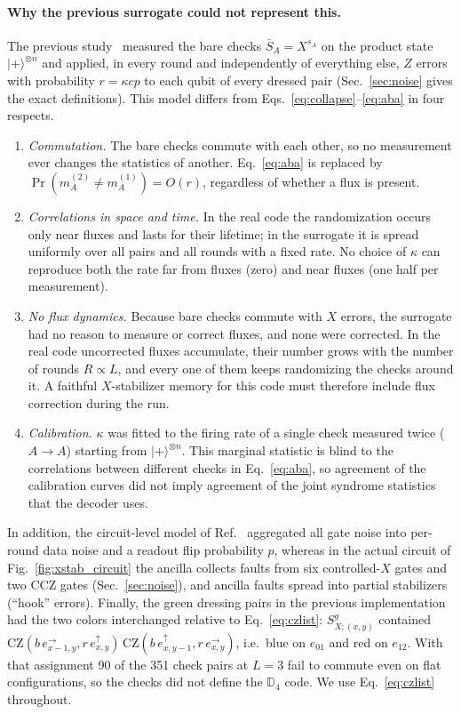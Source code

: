 \documentclass[a4paper]{article}
\newcommand{\rd}{r}
\newcommand{\gr}{g}
\newcommand{\bl}{b}
\providecommand{\ket}[1]{\ensuremath{|#1\rangle}}
\newcommand{\eh}[1]{e^{\rightarrow}_{#1}}   %
\newcommand{\ev}[1]{e^{\uparrow}_{#1}}      %
\begin{document}
\paragraph{Why the previous surrogate could not represent this.}
The previous study~\cite{haga2026aqis} measured the bare checks $\bar S_A=X^{s_A}$ on the product state $\ket{+}^{\otimes n}$ and applied, in every round and independently of everything else, $Z$ errors with probability $r=\kappa cp$ to each qubit of every dressed pair (Sec.~\ref{sec:noise} gives the exact definitions). This model differs from Eqs.~\eqref{eq:collapse}--\eqref{eq:aba} in four respects.
\begin{enumerate}[leftmargin=*,itemsep=0pt]
\item \emph{Commutation.} The bare checks commute with each other, so no measurement ever changes the statistics of another. Eq.~\eqref{eq:aba} is replaced by $\Pr(m_A^{(2)}\neq m_A^{(1)})=O(r)$, regardless of whether a flux is present.
\item \emph{Correlations in space and time.} In the real code the randomization occurs only near fluxes and lasts for their lifetime; in the surrogate it is spread uniformly over all pairs and all rounds with a fixed rate. No choice of $\kappa$ can reproduce both the rate far from fluxes (zero) and near fluxes (one half per measurement).
\item \emph{No flux dynamics.} Because bare checks commute with $X$ errors, the surrogate had no reason to measure or correct fluxes, and none were corrected. In the real code uncorrected fluxes accumulate, their number grows with the number of rounds $R\propto L$, and every one of them keeps randomizing the checks around it. A faithful $X$-stabilizer memory for this code must therefore include flux correction during the run.
\item \emph{Calibration.} $\kappa$ was fitted to the firing rate of a single check measured twice ($A\to A$) starting from $\ket{+}^{\otimes n}$. This marginal statistic is blind to the correlations between different checks in Eq.~\eqref{eq:aba}, so agreement of the calibration curves did not imply agreement of the joint syndrome statistics that the decoder uses.
\end{enumerate}
In addition, the circuit-level model of Ref.~\cite{haga2026aqis} aggregated all gate noise into per-round data noise and a readout flip probability $p$, whereas in the actual circuit of Fig.~\ref{fig:xstab_circuit} the ancilla collects faults from six controlled-$X$ gates and two CCZ gates (Sec.~\ref{sec:noise}), and ancilla faults spread into partial stabilizers (``hook'' errors). Finally, the green dressing pairs in the previous implementation had the two colors interchanged relative to Eq.~\eqref{eq:czlist}: $S^\gr_{X;(x,y)}$ contained $\mathrm{CZ}(\bl\,\eh{x-1,y},\rd\,\ev{x,y})\,\mathrm{CZ}(\bl\,\ev{x,y-1},\rd\,\eh{x,y})$, i.e.\ blue on $e_{01}$ and red on $e_{12}$. With that assignment 90 of the 351 check pairs at $L=3$ fail to commute even on flat configurations, so the checks did not define the $\mathbb{D}_4$ code. We use Eq.~\eqref{eq:czlist} throughout.
\end{document}
